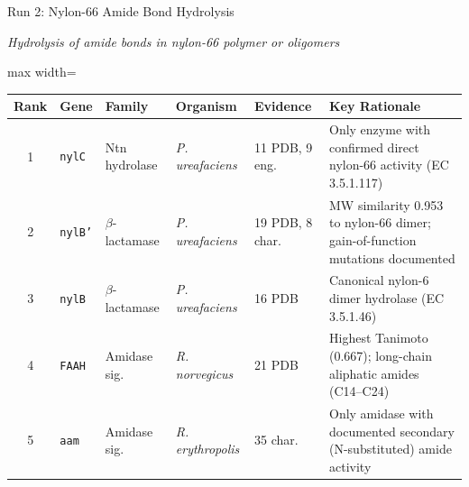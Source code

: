 \documentclass[aspectratio=169, 11pt]{beamer}
\begin{document}
\begin{frame}{Run 2: Nylon-66 Amide Bond Hydrolysis}
\vspace{-8pt}
\begin{center}
\scriptsize\color{darkgray} \textit{Hydrolysis of amide bonds in nylon-66 polymer or oligomers}
\end{center}
\vspace{-4pt}

{\scriptsize
\begin{adjustbox}{max width=\textwidth}
\begin{tabular}{@{}c l l l l p{5.5cm}@{}}
\toprule
\textbf{Rank} & \textbf{Gene} & \textbf{Family} & \textbf{Organism} & \textbf{Evidence} & \textbf{Key Rationale}\\
\midrule
1 & \texttt{nylC} & Ntn hydrolase & \textit{P.\,ureafaciens} & 11 PDB, 9 eng. &
Only enzyme with confirmed direct nylon-66 activity (EC 3.5.1.117)\\
2 & \texttt{nylB'} & $\beta$-lactamase & \textit{P.\,ureafaciens} & 19 PDB, 8 char. &
MW similarity 0.953 to nylon-66 dimer; gain-of-function mutations documented\\
3 & \texttt{nylB} & $\beta$-lactamase & \textit{P.\,ureafaciens} & 16 PDB &
Canonical nylon-6 dimer hydrolase (EC 3.5.1.46)\\
4 & \texttt{FAAH} & Amidase sig. & \textit{R.\,norvegicus} & 21 PDB &
Highest Tanimoto (0.667); long-chain aliphatic amides (C14--C24)\\
5 & \texttt{aam} & Amidase sig. & \textit{R.\,erythropolis} & 35 char. &
Only amidase with documented secondary (N-substituted) amide activity\\
\bottomrule
\end{tabular}
\end{adjustbox}
}


\end{frame}
\end{document}
